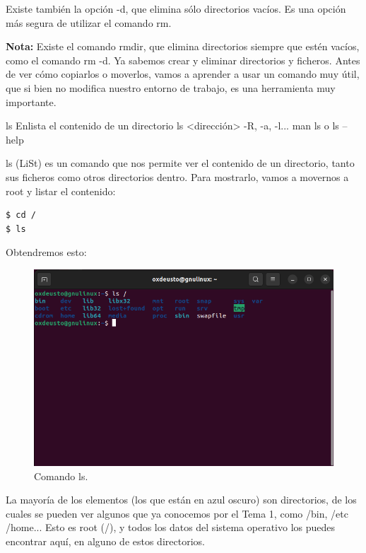 Existe también la opción -d, que elimina sólo directorios vacíos. Es una opción más segura de utilizar el comando rm.

\textbf{\textbf{Nota:}} Existe el comando rmdir, que elimina directorios siempre que estén vacíos, como el comando rm -d.
Ya sabemos crear y eliminar directorios y ficheros. Antes de ver cómo copiarlos o moverlos, vamos a aprender a usar un comando muy útil, que si bien no modifica nuestro entorno de trabajo, es una herramienta muy importante.

\begin{command-info}
{ls}
{Enlista el contenido de un directorio}
{ls <dirección>}
{-R, -a, -l...}
{man ls o ls --help}
\end{command-info}

ls (LiSt) es un comando que nos permite ver el contenido de un directorio, tanto sus ficheros como otros directorios dentro. Para mostrarlo, vamos a movernos a root y listar el contenido:

\begin{tcolorbox-code}
\begin{lstlisting}
$ cd /
$ ls
\end{lstlisting}
\end{tcolorbox-code}

Obtendremos esto:
\begin{figure}[H]
    \centering
    \includegraphics[width=0.8\linewidth]{resources/images/ls_1.png}
    \caption{Comando ls.}
\end{figure}

La mayoría de los elementos (los que están en azul oscuro) son directorios, de los cuales se pueden ver algunos que ya conocemos por el Tema 1, como /bin, /etc /home... Esto es root (/), y todos los datos del sistema operativo los puedes encontrar aquí, en alguno de estos directorios.


